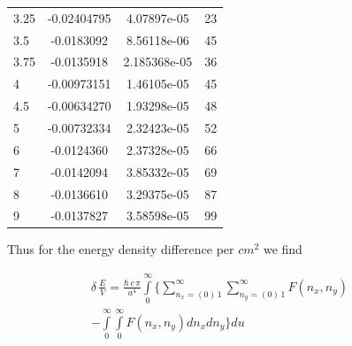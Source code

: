 \documentclass[twoside, 10pt]{article}
\begin{document}
\begin{multicols}{2}
\begin{center}
\begin{tabular}{ | l | c | c | c | }
3.25 & -0.02404795 & 4.07897e-05 & 23 \\
3.5 & -0.0183092 & 8.56118e-06 & 45 \\
3.75 & -0.0135918 & 2.185368e-05 & 36 \\
4 & -0.00973151 & 1.46105e-05 & 45 \\
4.5 & -0.00634270 & 1.93298e-05 & 48 \\
5 & -0.00732334 & 2.32423e-05 & 52 \\
6 & -0.0124360 & 2.37328e-05 & 66 \\
7 & -0.0142094 & 3.85332e-05 & 69 \\
8 & -0.0136610 & 3.29375e-05 & 87 \\
9 & -0.0137827 & 3.58598e-05 & 99 \\
\hline
\end{tabular}
\end{center}

    Thus for the energy density difference per \(cm^2\) we find

\begin{equation}
\begin{array}{r}
    \delta\,\frac{E}{V} = \frac{\hbar\,c\,\pi}{a^4} \int\limits_{0}^{\infty} \Bigg\{ \sum\limits_{n_x=\left(0\right)\,1}^{\infty} \sum\limits_{n_y=\left(0\right)\,1}^{\infty} F\left(n_x, n_y\right) \,\,\,\,\,\,\,\,\,\,\\ 
- \int\limits_{0}^{\infty} \int\limits_{0}^{\infty} F\left(n_x, n_y\right) d{n_x} d{n_y} \Bigg\} d{u}
\end{array}
\end{equation}


\end{multicols}
\end{document}
